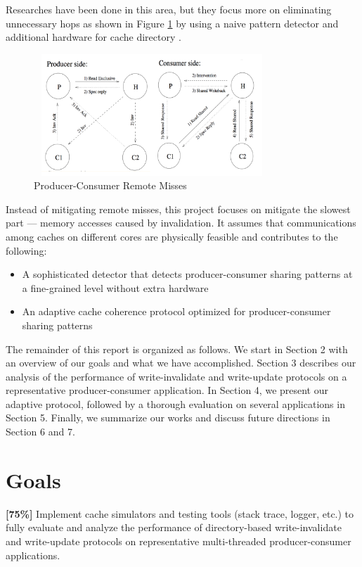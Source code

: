 \documentclass[11pt,conference]{IEEEtran}
\begin{document}
Researches have been done in this area, but they focus more on eliminating unnecessary hops as shown in Figure \ref{write_invalidate_hops} by using a naive pattern detector and additional hardware for cache directory \cite{work1}.
\begin{figure}[!h]
\centering
\captionsetup{justification=centering}
\includegraphics[width=3.5in,height=1.8in]{write_invalidate_hops.png}
\caption{Producer-Consumer Remote Misses}
\label{write_invalidate_hops}
\end{figure}
\FloatBarrier

 Instead of mitigating remote misses, this project focuses on mitigate the slowest part --- memory accesses caused by invalidation. It assumes that communications among caches on different cores are physically feasible and contributes to the following:
\begin{itemize}
  \item A sophisticated detector that detects producer-consumer sharing patterns at a fine-grained level without extra hardware
  \item An adaptive cache coherence protocol optimized for producer-consumer sharing patterns
\end{itemize}

The remainder of this report is organized as follows. We start in Section 2 with an overview of our goals and what we have accomplished. Section 3 describes our analysis of the performance of write-invalidate and write-update protocols on a representative producer-consumer application. In Section 4, we present our adaptive protocol, followed by a thorough evaluation on several applications in Section 5. Finally, we summarize our works and discuss future directions in Section 6 and 7.


\section{Goals}

\textbf{[75\%]} Implement cache simulators and testing tools (stack trace, logger, etc.) to fully evaluate and analyze the performance of directory-based write-invalidate and write-update protocols on representative multi-threaded producer-consumer applications.
\end{document}
